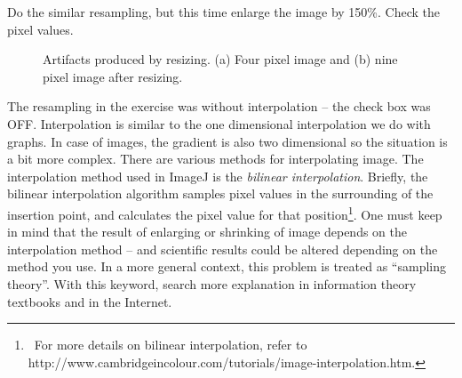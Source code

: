 \begin{indentexercise}{2}
Do the similar resampling, but this time enlarge
the image by 150\%. Check the pixel values.
\begin{figure}[htbp]
\centering
{}
\caption{ Artifacts produced by resizing. (a) Four pixel image and (b) nine pixel image after
resizing. }
\label{fig:resizing}
\end{figure} 

\end{indentexercise}

The resampling in the exercise was without interpolation -- the check box
was OFF. Interpolation is similar to the one dimensional interpolation
we do with graphs. In case of images, the gradient is also two
dimensional so the situation is a bit more complex. There are various
methods for interpolating image. The interpolation method used in
ImageJ is the \textit{bilinear interpolation}. Briefly, the bilinear
interpolation algorithm samples pixel values in the surrounding of the
insertion point, and calculates the pixel value for that
position\footnote{\ For more details on bilinear interpolation, refer
to\\
http://www.cambridgeincolour.com/tutorials/image-interpolation.htm.}.
One must keep in mind that the result of enlarging or shrinking of
image depends on the interpolation method -- and scientific results
could be altered depending on the method you use. In a more general context, this problem is treated as ``sampling theory''. With this keyword, search more explanation in information theory textbooks and in the Internet. 

